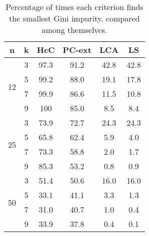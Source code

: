 \begin{table}
\centering
\begin{tabular}{c|c|c|c|c|c} 
        n            &    k        &   HcC   &   PC-ext   &   LCA   &   LS   \\
\hline
\multirow{4}{*}{12}  &    3        &   97.3  &   91.2     &   42.8  &  42.8  \\
                     &    5        &   99.2  &   88.0     &   19.1  &  17.8  \\
                     &    7        &   99.9  &   86.6     &   11.5  &  10.8  \\
                     &    9        &   100   &   85.0     &    8.5  &   8.4  \\
\hline
\multirow{4}{*}{25}  &    3        &   73.9  &   72.7     &   24.3  &  24.3  \\
                     &    5        &   65.8  &   62.4     &    5.9  &   4.0  \\
                     &    7        &   73.3  &   58.8     &    2.0  &   1.7  \\
                     &    9        &   85.3  &   53.2     &    0.8  &   0.9  \\
\hline
\multirow{4}{*}{50}  &    3        &   51.4  &   50.6     &   16.0  &  16.0  \\
                     &    5        &   33.1  &   41.1     &    3.3  &   1.3  \\
                     &    7        &   31.0  &   40.7     &    1.0  &   0.4  \\
                     &    9        &   33.9  &   37.8     &    0.4  &   0.1
\end{tabular}
\caption{Percentage of times each criterion finds the smallest Gini impurity, compared among themselves.}
\label{tab:Splits-Gini}
\end{table}

